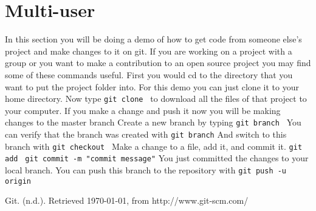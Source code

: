 \documentclass[11pt]{report}
\begin{document}
\chapter{Multi-user}
In this section you will be doing a demo of how to get code from someone else's project and make changes to it on git. If you are working on a project with a group or you want to make a contribution to an open source project you may find some of these commands useful.
First you would cd to the directory that you want to put the project folder into.
For this demo you can just clone it to your home directory.
Now type \texttt{git clone } to download all the files of that project to your computer.
If you make a change and push it now you will be making changes to the master branch
Create a new branch by typing \texttt{git branch }
You can verify that the branch was created with \texttt{git branch}
And switch to this branch with \texttt{git checkout }
Make a change to a file, add it, and commit it.
\texttt{git add }
\texttt{git commit -m "commit message"}
You just committed the changes to your local branch.
You can push this branch to the repository with \texttt{git push -u origin }


\begin{thebibliography}{9}

    Git. (n.d.). Retrieved \today, from http://www.git-scm.com/

\end{thebibliography}
\end{document}
